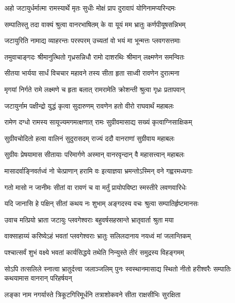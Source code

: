 \twolineshloka
{अहो जटायुर्धर्मात्मा रामस्यार्थे मृतः सुधीः}
{मोक्षं प्राप दुरावापं योगिनामप्यरिन्दमः} %

\twolineshloka
{सम्पातिस्तु तदा वाक्यं श्रुत्वा वानरभाषितम्}
{के वा यूयं मम भ्रातुः कर्णपीयूषसन्निभम्} %

\twolineshloka
{जटायुरिति नामाद्य व्याहरन्तः परस्परम्}
{उच्यतां वो भयं मा भून्मत्तः प्लवगसत्तमाः} %

\twolineshloka
{तमुवाचाङ्गदः श्रीमानुत्थितो गृध्रसन्निधौ}
{रामो दाशरथिः श्रीमान् लक्ष्मणेन समन्वितः} %

\twolineshloka
{सीतया भार्यया सार्धं विचचार महावने}
{तस्य सीता हृता साध्वी रावणेन दुरात्मना} %

\twolineshloka
{मृगयां निर्गते रामे लक्ष्मणे च हृता बलात्}
{रामरामेति क्रोशन्ती श्रुत्वा गृध्रः प्रतापवान्} %

\twolineshloka
{जटायुर्नाम पक्षीन्द्रो युद्धं कृत्वा सुदारुणम्}
{रावणेन हतो वीरो राघवार्थं महाबलः} %

\twolineshloka
{रामेण दग्धो रामस्य सायूज्यमगमत्क्षणात्}
{रामः सुग्रीवमासाद्य सख्यं कृत्वाग्निसाक्षिकम्} %

\twolineshloka
{सुग्रीवचोदितो हत्वा वालिनं सुदुरासदम्}
{राज्यं ददौ वानराणां सुग्रीवाय महाबलः} %

\twolineshloka
{सुग्रीवः प्रेषयामास सीतायाः परिमार्गणे}
{अस्मान् वानरवृन्दान् वै महासत्त्वान् महाबलः} %

\twolineshloka
{मासादर्वाङ्निवर्तध्वं नो चेत्प्राणान् हरामि वः}
{इत्याज्ञया भ्रमन्तोऽस्मिन् वने गह्वरमध्यगाः} %

\twolineshloka
{गतो मासो न जानीमः सीतां वा रावणं च वा}
{मर्तुं प्रायोपविष्टा स्मस्तीरे लवणवारिधेः} %

\twolineshloka
{यदि जानासि हे पक्षिन् सीतां कथय नः शुभाम्}
{अङ्गदस्य वचः श्रुत्वा सम्पातिर्हृष्टमानसः} %

\twolineshloka
{उवाच मत्प्रियो भ्राता जटायुः प्लवगेश्वराः}
{बहुवर्षसहस्रान्ते भ्रातृवार्ता श्रुता मया} %

\twolineshloka
{वाक्साहाय्यं करिष्येऽहं भवतां प्लवगेश्वराः}
{भ्रातुः सलिलदानाय नयध्वं मां जलान्तिकम्} %

\twolineshloka
{पश्चात्सर्वं शुभं वक्ष्ये भवतां कार्यसिद्धये}
{तथेति निन्युस्ते तीरं समुद्रस्य विहङ्गमम्} %

\threelineshloka
{सोऽपि तत्सलिले स्नात्वा भ्रातुर्दत्त्वा जलाञ्जलिम्}
{पुनः स्वस्थानमासाद्य स्थितो नीतो हरीश्वरैः}
{सम्पातिः कथयामास वानरान् परिहर्षयन्} %

\twolineshloka
{लङ्का नाम नगर्यास्ते त्रिकूटगिरिमूर्धनि}
{तत्राशोकवने सीता राक्षसीभिः सुरक्षिता} %

